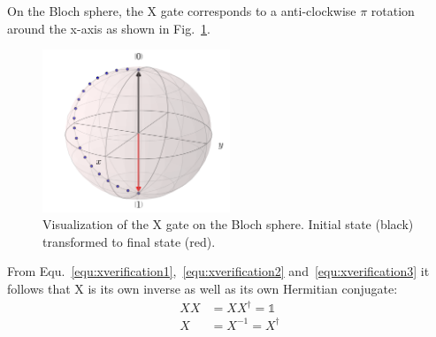 On the Bloch sphere, the X gate corresponds to a anti-clockwise $\pi$ rotation around the x-axis as shown in Fig.~\ref{img:blochxgate}.

\begin{figure}[ht]
   \centering
   \includegraphics[width=0.5\textwidth]{img/blochxgate.png}
   \caption{Visualization of the X gate on the Bloch sphere. Initial state (black) transformed to final state (red).}
   \label{img:blochxgate}
\end{figure}

From Equ.~\ref{equ:xverification1},~\ref{equ:xverification2} and~\ref{equ:xverification3} it follows that X is its own inverse as well as its own Hermitian conjugate:
\begin{align}
XX &= XX^\dagger = \mathbb{1} \\
X &= X^{-1} = X^\dagger
\end{align}

